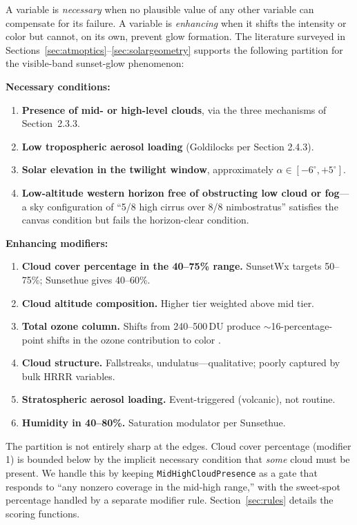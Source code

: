 \documentclass[11pt,a4paper]{article}
\begin{document}
A variable is \emph{necessary} when no plausible value of any other variable can compensate for its failure. A variable is \emph{enhancing} when it shifts the intensity or color but cannot, on its own, prevent glow formation. The literature surveyed in Sections~\ref{sec:atmoptics}--\ref{sec:solargeometry} supports the following partition for the visible-band sunset-glow phenomenon:

\textbf{Necessary conditions:}
\begin{enumerate}
\item \textbf{Presence of mid- or high-level clouds}, via the three mechanisms of Section~2.3.3.
\item \textbf{Low tropospheric aerosol loading} (Goldilocks per Section 2.4.3).
\item \textbf{Solar elevation in the twilight window}, approximately $\alpha \in [-6^\circ, +5^\circ]$.
\item \textbf{Low-altitude western horizon free of obstructing low cloud or fog}---a sky configuration of ``5/8 high cirrus over 8/8 nimbostratus'' satisfies the canvas condition but fails the horizon-clear condition.
\end{enumerate}

\textbf{Enhancing modifiers:}
\begin{enumerate}
\item \textbf{Cloud cover percentage in the 40--75\% range.} SunsetWx targets 50--75\%; Sunsethue gives 40--60\%.
\item \textbf{Cloud altitude composition.} Higher tier weighted above mid tier.
\item \textbf{Total ozone column.} Shifts from 240--500\,DU produce $\sim$16-percentage-point shifts in the ozone contribution to color \citep{lange2023revisiting}.
\item \textbf{Cloud structure.} Fallstreaks, undulatus---qualitative; poorly captured by bulk HRRR variables.
\item \textbf{Stratospheric aerosol loading.} Event-triggered (volcanic), not routine.
\item \textbf{Humidity in 40--80\%.} Saturation modulator per Sunsethue.
\end{enumerate}

The partition is not entirely sharp at the edges. Cloud cover percentage (modifier 1) is bounded below by the implicit necessary condition that \emph{some} cloud must be present. We handle this by keeping \texttt{MidHighCloudPresence} as a gate that responds to ``any nonzero coverage in the mid-high range,'' with the sweet-spot percentage handled by a separate modifier rule. Section~\ref{sec:rules} details the scoring functions.
\end{document}
